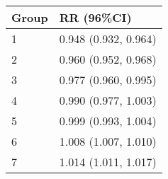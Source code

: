 \begin{tabular}{ll}
  \hline
Group & RR (96\%CI) \\ 
  \hline
   1 & 0.948 (0.932, 0.964) \\ 
     2 & 0.960 (0.952, 0.968) \\ 
     3 & 0.977 (0.960, 0.995) \\ 
     4 & 0.990 (0.977, 1.003) \\ 
     5 & 0.999 (0.993, 1.004) \\ 
     6 & 1.008 (1.007, 1.010) \\ 
     7 & 1.014 (1.011, 1.017) \\ 
   \hline
\end{tabular}

